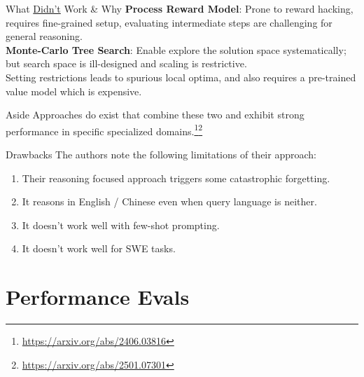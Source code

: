 \documentclass{beamer}
\begin{document}
{\let\oldfootnoterule\footnoterule
\def\footnoterule{\only<3->\oldfootnoterule}
\begin{frame}{What \underline{Didn't} Work \& Why}
	\textbf{Process Reward Model}: Prone to reward hacking, requires fine-grained setup, evaluating intermediate steps are challenging for general reasoning. \pause \newline \\

	\textbf{Monte-Carlo Tree Search}: Enable explore the solution space systematically; but search space is ill-designed and scaling is restrictive. \pause \newline \\

	Setting restrictions leads to spurious local optima, and also requires a pre-trained value model which is expensive. \pause \newline \\

	\begin{block}{Aside}
		Approaches do exist that combine these two and exhibit strong performance in specific specialized domains.\footnote<3->{\url{https://arxiv.org/abs/2406.03816}}\footnote<3->{\url{https://arxiv.org/abs/2501.07301}}
	\end{block}
\end{frame}
}

\begin{frame}{Drawbacks}
	The authors note the following limitations of their approach:
	\begin{enumerate}[label=\arabic*.]
		\item Their reasoning focused approach triggers some catastrophic forgetting. \pause \\
		\item It reasons in English / Chinese even when query language is neither. \pause \\
		\item It doesn't work well with few-shot prompting. \pause \\
		\item It doesn't work well for SWE tasks.
	\end{enumerate}
\end{frame}

\section{Performance Evals}
\end{document}
